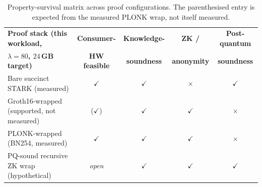 \begin{table}[H]
    \centering
    \small
    \renewcommand{\arraystretch}{1.3}
    \begin{tabular}{@{}p{4.0cm}cccc@{}}
        \toprule
        \textbf{Proof stack (this workload,} & \textbf{Consumer-} & \textbf{Knowledge-} & \textbf{ZK /} & \textbf{Post-quantum} \\
        \textbf{$\lambda=80$, $24$\,GB target)} & \textbf{HW feasible} & \textbf{soundness} & \textbf{anonymity} & \textbf{soundness} \\
        \midrule
        Bare succinct STARK (measured) & $\checkmark$ & $\checkmark$ & $\times$ & $\checkmark$ \\
        Groth16-wrapped (supported, not measured) & ($\checkmark$) & $\checkmark$ & $\checkmark$ & $\times$ \\
        PLONK-wrapped (BN254, measured) & $\checkmark$ & $\checkmark$ & $\checkmark$ & $\times$ \\
        PQ-sound recursive ZK wrap (hypothetical) & \emph{open} & $\checkmark$ & $\checkmark$ & $\checkmark$ \\
        \bottomrule
    \end{tabular}
    \caption{Property-survival matrix across proof configurations. The parenthesised entry is expected from the measured PLONK wrap, not itself measured.}
    \label{tab:property-survival}
\end{table}

